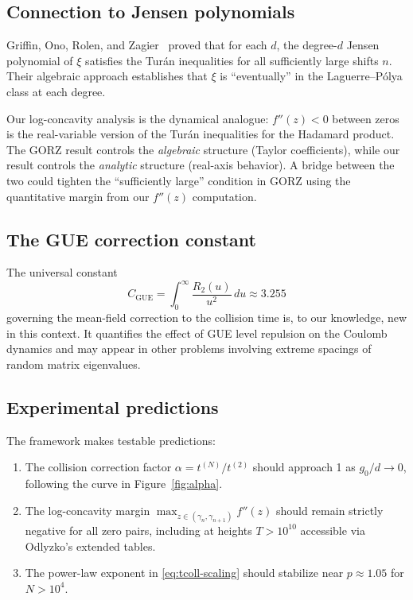\documentclass[11pt,a4paper]{article}
\begin{document}
\subsection{Connection to Jensen polynomials}

Griffin, Ono, Rolen, and Zagier~\cite{gorz2019} proved that for each
$d$, the degree-$d$ Jensen polynomial of $\xi$ satisfies the
Tur\'an inequalities for all sufficiently large shifts $n$. Their
algebraic approach establishes that $\xi$ is ``eventually'' in the
Laguerre--P\'olya class at each degree.

Our log-concavity analysis is the dynamical analogue: $f''(z) < 0$
between zeros is the real-variable version of the Tur\'an
inequalities for the Hadamard product. The GORZ result controls the
\emph{algebraic} structure (Taylor coefficients), while our result
controls the \emph{analytic} structure (real-axis behavior). A bridge
between the two could tighten the ``sufficiently large'' condition in
GORZ using the quantitative margin from our $f''(z)$ computation.

\subsection{The GUE correction constant}

The universal constant
\[
  C_{\mathrm{GUE}} = \int_0^\infty \frac{R_2(u)}{u^2}\,du \approx 3.255
\]
governing the mean-field correction to the collision time is, to our
knowledge, new in this context. It quantifies the effect of GUE level
repulsion on the Coulomb dynamics and may appear in other problems
involving extreme spacings of random matrix eigenvalues.

\subsection{Experimental predictions}

The framework makes testable predictions:
\begin{enumerate}
  \item The collision correction factor $\alpha = t^{(N)}/t^{(2)}$
    should approach 1 as $g_0/d \to 0$, following the curve in
    Figure~\ref{fig:alpha}.
  \item The log-concavity margin $\max_{z \in (\gamma_n,
    \gamma_{n+1})} f''(z)$ should remain strictly negative for all
    zero pairs, including at heights $T > 10^{10}$ accessible via
    Odlyzko's extended tables.
  \item The power-law exponent in \eqref{eq:tcoll-scaling} should
    stabilize near $p \approx 1.05$ for $N > 10^4$.
\end{enumerate}
\end{document}
